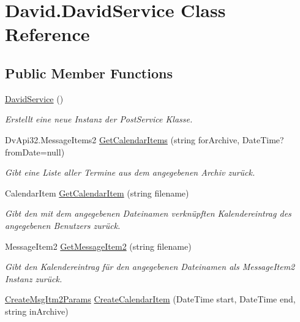 \hypertarget{class_david_1_1_david_service}{}\section{David.\+David\+Service Class Reference}
\label{class_david_1_1_david_service}
\subsection*{Public Member Functions}
\begin{DoxyCompactItemize}
\item 
\hyperlink{class_david_1_1_david_service_a096415c82fdf64887fe387832cf6df7f}{David\+Service} ()
\begin{DoxyCompactList}\small\item\em Erstellt eine neue Instanz der Post\+Service Klasse. \end{DoxyCompactList}\item 
Dv\+Api32.\+Message\+Items2 \hyperlink{class_david_1_1_david_service_abc536b5c1b0a1173d73fbbe80a3ccc4d}{Get\+Calendar\+Items} (string for\+Archive, Date\+Time?from\+Date=null)
\begin{DoxyCompactList}\small\item\em Gibt eine Liste aller Termine aus dem angegebenen Archiv zurück. \end{DoxyCompactList}\item 
Calendar\+Item \hyperlink{class_david_1_1_david_service_af453f2d226fe56533cbd4d28c30aeddc}{Get\+Calendar\+Item} (string filename)
\begin{DoxyCompactList}\small\item\em Gibt den mit dem angegebenen Dateinamen verknüpften Kalendereintrag des angegebenen Benutzers zurück. \end{DoxyCompactList}\item 
Message\+Item2 \hyperlink{class_david_1_1_david_service_ad45d68a8cbd42b94d6ab93af90c04d47}{Get\+Message\+Item2} (string filename)
\begin{DoxyCompactList}\small\item\em Gibt den Kalendereintrag für den angegebenen Dateinamen als Message\+Item2 Instanz zurück. \end{DoxyCompactList}\item 
\hyperlink{class_david_1_1_create_msg_itm2_params}{Create\+Msg\+Itm2\+Params} \hyperlink{class_david_1_1_david_service_a3ef3aeba0ec6d403bbb13e395def777b}{Create\+Calendar\+Item} (Date\+Time start, Date\+Time end, string in\+Archive)

\end{DoxyCompactItemize}
